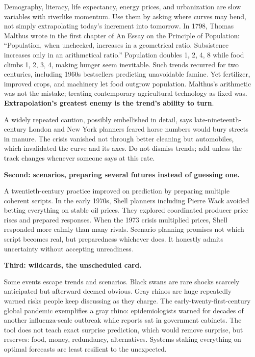 Demography, literacy, life expectancy, energy prices, and urbanization are slow variables with riverlike momentum. Use them by asking where curves may bend, not simply extrapolating today's increment into tomorrow. In 1798, Thomas Malthus wrote in the first chapter of An Essay on the Principle of Population: ``Population, when unchecked, increases in a geometrical ratio. Subsistence increases only in an arithmetical ratio.'' Population doubles 1, 2, 4, 8 while food climbs 1, 2, 3, 4, making hunger seem inevitable. Such trends recurred for two centuries, including 1960s bestsellers predicting unavoidable famine. Yet fertilizer, improved crops, and machinery let food outgrow population. Malthus's arithmetic was not the mistake; treating contemporary agricultural technology as fixed was. \textbf{Extrapolation's greatest enemy is the trend's ability to turn}.

A widely repeated caution, possibly embellished in detail, says late-nineteenth-century London and New York planners feared horse numbers would bury streets in manure. The crisis vanished not through better cleaning but automobiles, which invalidated the curve and its axes. Do not dismiss trends; add unless the track changes whenever someone says at this rate.

\textbf{Second: scenarios, preparing several futures instead of guessing one.}

A twentieth-century practice improved on prediction by preparing multiple coherent scripts. In the early 1970s, Shell planners including Pierre Wack avoided betting everything on stable oil prices. They explored coordinated producer price rises and prepared responses. When the 1973 crisis multiplied prices, Shell responded more calmly than many rivals. Scenario planning promises not which script becomes real, but preparedness whichever does. It honestly admits uncertainty without accepting unreadiness.

\textbf{Third: wildcards, the unscheduled card.}

Some events escape trends and scenarios. Black swans are rare shocks scarcely anticipated but afterward deemed obvious. Gray rhinos are huge repeatedly warned risks people keep discussing as they charge. The early-twenty-first-century global pandemic exemplifies a gray rhino: epidemiologists warned for decades of another influenza-scale outbreak while reports sat in government cabinets. The tool does not teach exact surprise prediction, which would remove surprise, but reserves: food, money, redundancy, alternatives. Systems staking everything on optimal forecasts are least resilient to the unexpected.

